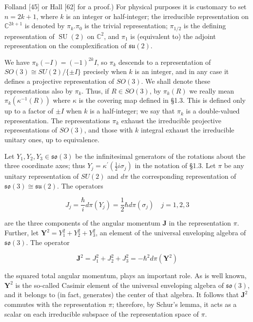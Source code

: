 \documentclass[10pt, letterpaper]{article}
\begin{document}
Folland [45] or Hall [62] for a proof.) For physical purposes it is customary to set $n=2 k+1$, where $k$ is an integer or half-integer; the irreducible representation on $\mathbb{C}^{2 k+1}$ is denoted by $\pi_{k} . \pi_{0}$ is the trivial representation; $\pi_{1 / 2}$ is the defining representation of $\operatorname{SU}(2)$ on $\mathbb{C}^{2}$, and $\pi_{1}$ is (equivalent to) the adjoint representation on the complexification of $\mathfrak{s u}(2)$.

We have $\pi_{k}(-I)=(-1)^{2 k} I$, so $\pi_{k}$ descends to a representation of $S O(3) \cong S U(2) /\{ \pm I\}$ precisely when $k$ is an integer, and in any case it defines a projective representation of $S O(3)$. We shall denote these representations also by $\pi_{k}$. Thus, if $R \in S O(3)$, by $\pi_{k}(R)$ we really mean $\pi_{k}\left(\kappa^{-1}(R)\right)$ where $\kappa$ is the covering map defined in §1.3. This is defined only up to a factor of $\pm I$ when $k$ is a half-integer; we say that $\pi_{k}$ is a double-valued representation. The representations $\pi_{k}$ exhaust the irreducible projective representations of $S O(3)$, and those with $k$ integral exhaust the irreducible unitary ones, up to equivalence.

Let $Y_{1}, Y_{2}, Y_{3} \in \mathfrak{s o}(3)$ be the infinitesimal generators of the rotations about the three coordinate axes; thus $Y_{j}=\kappa^{\prime}\left(\frac{1}{2} i \sigma_{j}\right)$ in the notation of §1.3. Let $\pi$ be any unitary representation of $S U(2)$ and $d \pi$ the corresponding representation of $\mathfrak{s o}(3) \cong \mathfrak{s u}(2)$. The operators

$$
J_{j}=\frac{\hbar}{i} d \pi\left(Y_{j}\right)=\frac{1}{2} \hbar d \pi\left(\sigma_{j}\right) \quad j=1,2,3
$$

are the three components of the angular momentum $\mathbf{J}$ in the representation $\pi$. Further, let $\mathbf{Y}^{2}=Y_{1}^{2}+Y_{2}^{2}+Y_{3}^{2}$, an element of the universal enveloping algebra of $\mathfrak{s o}(3)$. The operator

$$
\mathbf{J}^{2}=J_{1}^{2}+J_{2}^{2}+J_{3}^{2}=-\hbar^{2} d \pi\left(\mathbf{Y}^{2}\right)
$$

the squared total angular momentum, plays an important role. As is well known, $\mathbf{Y}^{2}$ is the so-called Casimir element of the universal enveloping algebra of $\mathfrak{s o}(3)$, and it belongs to (in fact, generates) the center of that algebra. It follows that $\mathbf{J}^{2}$ commutes with the representation $\pi$; therefore, by Schur's lemma, it acts as a scalar on each irreducible subspace of the representation space of $\pi$.
\end{document}

